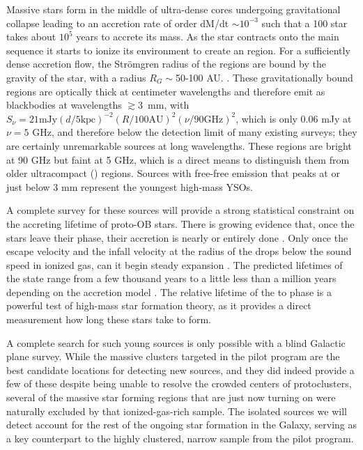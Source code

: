 \documentclass[11pt,preprint]{aastex_nofoot}
\begin{document}
Massive stars form in the middle of ultra-dense cores undergoing gravitational
collapse leading to an accretion rate of order dM/dt $\sim 10^{-3}$ \msun
\peryr such that a 100 \msun star takes about $10^5$ years to accrete its mass.  
As the star contracts onto the main sequence it starts to ionize its
environment to create an \hchii region.  For a sufficiently dense accretion
flow, the Strömgren radius of the \hchii regions are bound by the gravity of
the star, with a radius $R_G \sim$50-100 AU.
\citep{Keto2002a,Keto2003a,Keto2007a}.  These gravitationally bound \hchii
regions are optically thick at centimeter wavelengths and therefore emit as
blackbodies at wavelengths $\gtrsim$3~mm, with $S_\nu=21 \textrm{mJy} (d/5
\textrm{kpc})^{-2} (R/100 \textrm{AU})^2(\nu/90 \textrm{GHz})^2$, which is only
0.06 mJy at $\nu=5$ GHz, and therefore below the detection limit of many
existing surveys; they are certainly unremarkable sources at long wavelengths.
These \hchii regions are bright at 90 GHz but faint at 5 GHz, which is a direct
means to distinguish them from older ultracompact (\uchii) regions.  Sources
with free-free emission that peaks at or just below 3 mm represent the youngest
high-mass YSOs.

A complete survey for these sources will provide a strong statistical
constraint on the accreting lifetime of proto-OB stars.  There is growing
evidence that, once the stars leave their \hchii phase, their accretion is
nearly or entirely done \citep[e.g.,][]{Goddi2018a}.  Only once the escape
velocity and the infall velocity at the radius of the \hchii drops below the
sound speed in ionized gas, can it begin steady expansion \citep{Keto2006a}.
The predicted lifetimes of the \hchii state range from a few thousand years to
a little less than a million years depending on the accretion model
\citep{Keto2003a,Zhang2018a}.
The relative lifetime of the \hchii to \uchii phase is a powerful
test of high-mass star formation theory, as it provides a direct measurement
how long these stars take to form.

A complete search for such young sources is only possible with a blind Galactic
plane survey.  While the massive clusters targeted in the pilot program are the
best candidate locations for detecting new sources, and they did indeed provide
a few of these despite being unable to resolve the crowded centers of
protoclusters, several of the massive star forming regions that are just now
turning on were naturally excluded by that ionized-gas-rich sample.  The
isolated sources we will detect account for the rest of the ongoing star
formation in the Galaxy, serving as a key counterpart to the highly clustered,
narrow sample from the pilot program.
\end{document}
